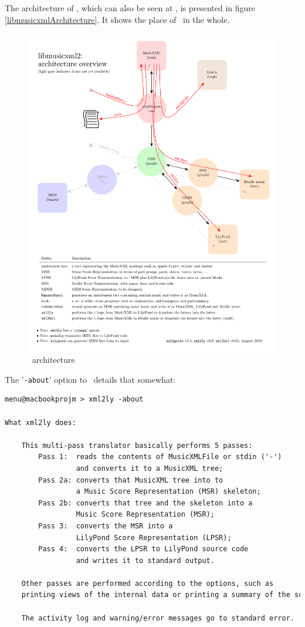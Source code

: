 \documentclass[12pt,a4paper]{article}
\begin{document}
The architecture of \lib, which can also be seen at , is presented in figure \ref{libmusicxmlArchitecture}.
It shows the place of \xmlToLy\ in the whole.

\begin{figure}
\caption{\lib\ architecture}
\includegraphics[scale=0.8]{../libmusicxmlArchitecture/libmusicxmlArchitecture.pdf}
\end{figure}

The '{\tt -about}' option to \xmlToLy\ details that somewhat:
\begin{lstlisting}[language=XML]
menu@macbookprojm > xml2ly -about

What xml2ly does:

    This multi-pass translator basically performs 5 passes:
        Pass 1:  reads the contents of MusicXMLFile or stdin ('-')
                 and converts it to a MusicXML tree;
        Pass 2a: converts that MusicXML tree into to
                 a Music Score Representation (MSR) skeleton;
        Pass 2b: converts that tree and the skeleton into a
                 Music Score Representation (MSR);
        Pass 3:  converts the MSR into a
                 LilyPond Score Representation (LPSR);
        Pass 4:  converts the LPSR to LilyPond source code
                 and writes it to standard output.

    Other passes are performed according to the options, such as
    printing views of the internal data or printing a summary of the score.

    The activity log and warning/error messages go to standard error.
\end{lstlisting}
\end{document}
